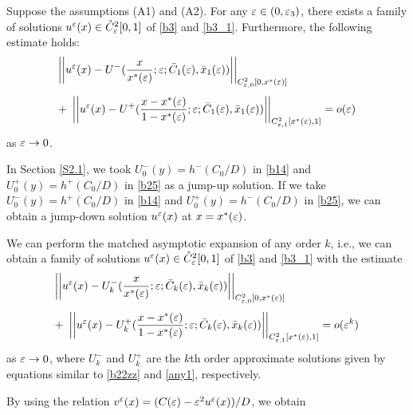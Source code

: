 \documentclass[a4,10pt]{article}
\begin{document}
\begin{theo}\label{th2}
Suppose the assumptions (A1) and (A2).
For any $\varepsilon \in (0, \varepsilon_3)$, there exists a family of solutions $u^\ep(x) \in \pot{C}^2_\ep[0,1]$ of \eqref{b3} and \eqref{b3_1}. Furthermore, the following estimate holds:
\begin{equation*}
\begin{array}{l}
\displaystyle \left|\left| u^\varepsilon(x) - U^-(\frac x{x^*(\varepsilon)};\varepsilon;  \bar{C}_1(\varepsilon), \bar{x}_1(\varepsilon)) \right|\right|_
{C^2_{\varepsilon,0}[0,x^*(\varepsilon)]} \\[4ex]
+ \ \displaystyle \left|\left| u^\varepsilon(x) - U^+(\frac {x-x^*(\varepsilon)}{1-x^*(\varepsilon)};\varepsilon; \bar{C}_1(\varepsilon), \bar{x}_1(\varepsilon)) \right|\right|_{C^2_{\varepsilon,1}[x^*(\varepsilon),1]} = o(\varepsilon)
\end{array}
\end{equation*}
as $\varepsilon \to 0$. 
\end{theo}


\begin{remark}
In Section \ref{S2.1}, we took $U_0^-(y) = h^-(C_0/D)$ in \eqref{b14} and $U_0^+(y) = h^+(C_0/D)$ in \eqref{b25} as a jump-up solution. If we take $U_0^-(y) = h^+(C_0/D)$ in \eqref{b14} and $U_0^+(y) = h^-(C_0/D)$ in \eqref{b25}, we can obtain a jump-down solution $u^\varepsilon(x)$ at $x = x^*(\varepsilon)$. 
\end{remark}


\begin{remark}
We can perform the matched asymptotic expansion of any order $k$, i.e., we can obtain 
a family of solutions $u^\ep(x) \in \pot{C}^2_\ep[0,1]$ of \eqref{b3} and \eqref{b3_1}
with the estimate
\begin{equation*}
\begin{array}{l}
\displaystyle \left|\left| u^\varepsilon(x) - U^-_k(\frac x{x^*(\varepsilon)};\varepsilon;  \bar{C}_k(\varepsilon), \bar{x}_k(\varepsilon)) \right|\right|_
{C^2_{\varepsilon,0}[0,x^*(\varepsilon)]} \\[4ex]
+ \ \displaystyle \left|\left| u^\varepsilon(x) - U^+_k(\frac {x-x^*(\varepsilon)}{1-x^*(\varepsilon)};\varepsilon; \bar{C}_k(\varepsilon), \bar{x}_k(\varepsilon)) \right|\right|_{C^2_{\varepsilon,1}[x^*(\varepsilon),1]} = o(\varepsilon^k)
\end{array}
\end{equation*}
as $\varepsilon \to 0$, where $U^{-}_k$ and $U^+_k$ are the $k$th order approximate solutions 
given by equations similar
to \eqref{b22zz} and \eqref{any1}, respectively.
\end{remark}


By using the relation $v^\varepsilon(x) = (C(\varepsilon) - \varepsilon^2 u^\varepsilon(x))/D$, we obtain 
\end{document}
